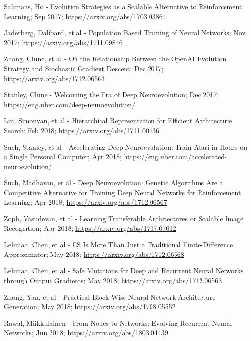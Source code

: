 \documentclass[journal, a4paper]{IEEEtran}
\begin{document}
\begin{thebibliography}{5}
    Salimans, Ho - Evolution Strategies as a Scalable Alternative to Reinforcement Learning; Sep 2017;
    \url{https://arxiv.org/abs/1703.03864}

    Jaderberg, Dalibard, et al - Population Based Training of Neural Networks; Nov 2017;
    \url{https://arxiv.org/abs/1711.09846}

    Zhang, Clune, et al - On the Relationship Between the OpenAI Evolution Strategy and Stochastic Gradient Descent; Dec 2017;
    \url{https://arxiv.org/abs/1712.06564}

    Stanley, Clune - Welcoming the Era of Deep Neuroevolution; Dec 2017;
    \url{https://eng.uber.com/deep-neuroevolution/}

    Liu, Simonyan, et al - Hierarchical Representation for Efficient Architecture Search; Feb 2018;
    \url{https://arxiv.org/abs/1711.00436}

    Such, Stanley, et al - Accelerating Deep Neuroevolution: Train Atari in Hours on a Single Personal Computer; Apr 2018;
    \url{https://eng.uber.com/accelerated-neuroevolution/}

    Such, Madhavan, et al - Deep Neuroevolution: Genetic Algorithms Are a Competitive Alternative for Training Deep Neural Networks for Reinforcement Learning; Apr 2018;
    \url{https://arxiv.org/abs/1712.06567}

    Zoph, Vasudevan, et al - Learning Transferable Architectures or Scalable Image Recognition; Apr 2018;
    \url{https://arxiv.org/abs/1707.07012}

    Lehman, Chen, et al - ES Is More Than Just a Traditional Finite-Difference Approximator; May 2018;
    \url{https://arxiv.org/abs/1712.06568}

    Lehman, Chen, et al - Safe Mutations for Deep and Recurrent Neural Networks through Output Gradients; May 2018;
    \url{https://arxiv.org/abs/1712.06563}

    Zhong, Yan, et al - Practical Block-Wise Neural Network Architecture Generation; May 2018;
    \url{https://arxiv.org/abs/1708.05552}

    Rawal, Miikkulainen - From Nodes to Networks: Evolving Recurrent Neural Networks; Jun 2018;
    \url{https://arxiv.org/abs/1803.04439}


\end{thebibliography}
\end{document}
